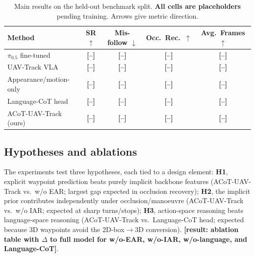 \documentclass[11pt]{article}
\newcommand{\ph}[1]{{\color{red}\textbf{[#1]}}}
\newcommand{\sys}{ACoT-UAV-Track}
\newcommand{\ear}{EAR}
\newcommand{\iar}{IAR}
\begin{document}
\begin{table}[t]
\centering
\caption{Main results on the held-out benchmark split. \textbf{All cells are
placeholders} pending training. Arrows give metric direction.}
\label{tab:main}
\small
\begin{tabular}{@{}lcccc@{}}
\toprule
Method & SR $\uparrow$ & Mis-follow $\downarrow$ & Occ.\ Rec.\ $\uparrow$ & Avg.\ Frames $\uparrow$ \\
\midrule
$\pi_{0.5}$ fine-tuned & \ph{--} & \ph{--} & \ph{--} & \ph{--} \\
UAV-Track VLA & \ph{--} & \ph{--} & \ph{--} & \ph{--} \\
Appearance/motion-only & \ph{--} & \ph{--} & \ph{--} & \ph{--} \\
Language-CoT head & \ph{--} & \ph{--} & \ph{--} & \ph{--} \\
\sys{} (ours) & \ph{--} & \ph{--} & \ph{--} & \ph{--} \\
\bottomrule
\end{tabular}
\end{table}

\subsection{Hypotheses and ablations}
\label{sec:exp-ablation}
The experiments test three hypotheses, each tied to a design element:
\textbf{H1}, explicit waypoint prediction beats purely implicit backbone
features (\sys{} vs.\ w/o \ear{}; largest gap expected in occlusion
recovery); \textbf{H2}, the implicit prior contributes independently under
occlusion/manoeuvre (\sys{} vs.\ w/o \iar{}; expected at sharp turns/stops);
\textbf{H3}, action-space reasoning beats language-space reasoning (\sys{}
vs.\ Language-CoT head; expected because 3D waypoints avoid the 2D-box$\to$3D
conversion). \ph{result: ablation table with $\Delta$ to full model for
w/o-\ear{}, w/o-\iar{}, w/o-language, and Language-CoT}.
\end{document}

